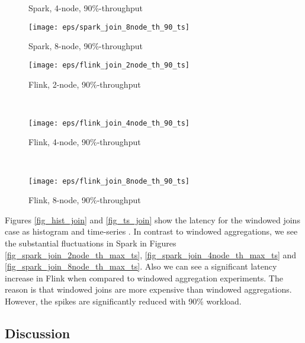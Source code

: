 {\begin{figure*}
\begin{subfigure}[b]{0.3\textwidth}
       \caption{Spark, 4-node,  90\%-throughput }
   \end{subfigure}%
   \begin{subfigure}[b]{0.3\textwidth}
       \texttt{[image: eps/spark\_join\_8node\_th\_90\_ts]}

       \caption{Spark, 8-node,  90\%-throughput }
   \end{subfigure}




   \begin{subfigure}[b]{0.3\textwidth}
       \texttt{[image: eps/flink\_join\_2node\_th\_90\_ts]}

       \caption{Flink, 2-node,  90\%-throughput}
   \end{subfigure}
   ~ 
   \begin{subfigure}[b]{0.3\textwidth}
       \texttt{[image: eps/flink\_join\_4node\_th\_90\_ts]}

       \caption{Flink, 4-node,  90\%-throughput }
   \end{subfigure}
   ~ 
   \begin{subfigure}[b]{0.3\textwidth}
       \texttt{[image: eps/flink\_join\_8node\_th\_90\_ts]}

       \caption{Flink, 8-node,  90\%-throughput }
   \end{subfigure}

        \caption{Windowed join latency distributions in time series}
                \label{fig_ts_join}
\end{figure*}













Figures  \ref{fig_hist_join} and \ref{fig_ts_join} show the latency for the windowed joins case as  histogram and time-series .  In contrast to windowed aggregations, we see the substantial fluctuations in Spark in Figures \ref{fig_spark_join_2node_th_max_ts}, \ref{fig_spark_join_4node_th_max_ts} and \ref{fig_spark_join_8node_th_max_ts}.
Also we can see a significant latency increase in Flink when compared to windowed aggregation experiments. The reason is that windowed joins are   more expensive than windowed aggregations. However, the spikes are significantly reduced with 90\% workload.  


\subsection{Discussion}

}
